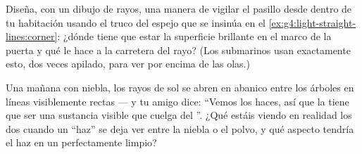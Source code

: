 \begin{exercise}[$\star\star$]\label{exo:g4:light-straight-lines:10}
Diseña, con un dibujo de rayos, una manera de vigilar el pasillo desde
dentro de tu habitación usando el truco del espejo que se insinúa en
el \cref{ex:g4:light-straight-lines:corner}: ¿dónde tiene que estar la
superficie brillante en el marco de la puerta y qué le hace a la
carretera del rayo? (Los submarinos usan exactamente esto, dos veces
apilado, para ver por encima de las olas.)
\end{exercise}

\begin{exercise}[$\star\star$]\label{exo:g4:light-straight-lines:11}
Una mañana con niebla, los rayos de sol se abren en abanico entre los
árboles en líneas visiblemente rectas --- y tu amigo dice: ``Vemos los
haces, así que la  tiene que ser una sustancia visible que cuelga
del ''. ¿Qué estáis viendo en realidad los dos cuando un ``haz''
se deja ver entre la niebla o el polvo, y qué aspecto tendría el haz
en un  perfectamente limpio?
\end{exercise}
